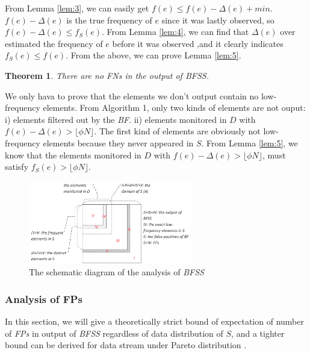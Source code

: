 \documentclass[conference]{IEEEtran}
\begin{document}
\begin{IEEEproof}
From Lemma \ref{lem:3}, we can easily get $f(e)\leq f(e)-\Delta(e)+min$. $f(e)-\Delta(e)$ is the true frequency of $e$ since it was lastly observed, so $f(e)-\Delta(e)\leq f_S(e)$. From Lemma \ref{lem:4}, we can find that $\Delta(e)$ over estimated the frequency of $e$ before it was observed ,and it clearly indicates $f_S(e)\leq f(e)$. From the above, we can prove Lemma \ref{lem:5}.
\end{IEEEproof}

\newtheorem{theorem}{Theorem}
\begin{theorem}\label{thm:1}
	There are no \emph{FNs} in the output of \emph{BFSS}.
\end{theorem}

\begin{IEEEproof}
We only hava to prove that the elements we don't output contain no low-frequency elements. From Algorithm 1, only two kinds of elements are not ouput: i) elements filtered out by the \emph{BF}. ii) elements monitored in $D$ with $f(e)-\Delta(e)>\lfloor \phi N\rfloor$. The first kind of elements are obviously not low-frequency elements because they never appeared in $S$. From Lemma \ref{lem:5}, we know that the elements monitored in $D$ with $f(e)-\Delta(e)>\lfloor \phi N\rfloor$, must satisfy $f_S(e)>\lfloor \phi N\rfloor$. 
\end{IEEEproof}

\begin{figure}
	\centering
	\includegraphics[width=2.8in]{png/bfss.png}
	\caption{The schematic diagram of the analysis of \emph{BFSS}}
	\label{fig:bfss}
\end{figure}

\subsubsection{\textbf{Analysis of FPs}}
In this section, we will give a theoretically strict bound of expectation of number of \emph{FPs} in output of \emph{BFSS} regardless of data distribution of $S$, and a tighter bound can be derived for data stream under Pareto distribution \cite{IEEEexample:pareto}.
\end{document}
